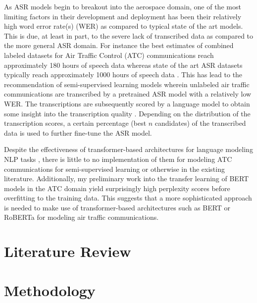 \documentclass{article}
\begin{document}
        As ASR models begin to breakout into the aerospace domain, one of the most limiting factors in their development and deployment has been their relatively high word error rate(s) (WER) \cite{vsmidl2019air,juan2020automatic,badrinath_automatic_2022} as compared to typical state of the art models.
        This is due, at least in part, to the severe lack of transcribed data as compared to the more general ASR domain.
        For instance the best estimates of combined labeled datasets for Air Traffic Control (ATC) communications reach approximately 180 hours of speech data \cite{juan2020automatic} whereas state of the art ASR datasets typically reach approximately 1000 hours of speech data \cite{librispeech_2015}.
        This has lead to the recommendation of semi-supervised learning models wherein unlabeled air traffic communications are transcribed by a pretrained ASR model with a relatively low WER.
        The transcriptions are subsequently scored by a language model to obtain some insight into the transcription quality \cite{badrinath_automatic_2022,zuluaga2021contextual}.
        Depending on the distribution of the transcription scores, a certain percentage (best $n$ candidates) of the transcribed data is used to further fine-tune the ASR model.


        Despite the effectiveness of transformer-based architectures for language modeling NLP tasks \cite{devlin_bert_2019,lewis_bart_2019,liu2019roberta}, there is little to no implementation of them for modeling ATC communications for semi-supervised learning or otherwise in the existing literature.
        Additionally, my preliminary work into the transfer learning of BERT models in the ATC domain yield surprisingly high perplexity scores before overfitting to the training data.
        This suggests that a more sophisticated approach is needed to make use of transformer-based architectures such as BERT or RoBERTa for modeling air traffic communications.

    \section{Literature Review}

    \section{Methodology}
\end{document}
